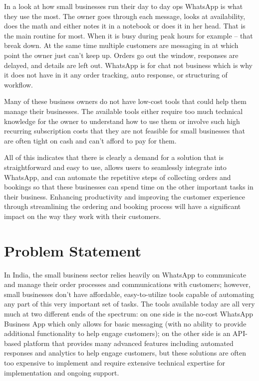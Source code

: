 In a look at how small businesses run their day to day ops WhatsApp is what they use the most. The owner goes through each message, looks at availability, does the math and either notes it in a notebook or does it in her head. That is the main routine for most. When it is busy during peak hours for example -- that break down. At the same time multiple customers are messaging in at which point the owner just can't keep up. Orders go out the window, responses are delayed, and details are left out. WhatsApp is for chat not business which is why it does not have in it any order tracking, auto response, or structuring of workflow.

Many of these business owners do not have low-cost tools that could help them manage their businesses. The available tools either require too much technical knowledge for the owner to understand how to use them or involve such high recurring subscription costs that they are not feasible for small businesses that are often tight on cash and can't afford to pay for them.

All of this indicates that there is clearly a demand for a solution that is straightforward and easy to use, allows users to seamlessly integrate into WhatsApp, and can automate the repetitive steps of collecting orders and bookings so that these businesses can spend time on the other important tasks in their business. Enhancing productivity and improving the customer experience through streamlining the ordering and booking process will have a significant impact on the way they work with their customers.


\section{Problem Statement}

In India, the small business sector relies heavily on WhatsApp to communicate and manage their order processes and communications with customers; however, small businesses don't have affordable, easy-to-utilize tools capable of automating any part of this very important set of tasks. The tools available today are all very much at two different ends of the spectrum: on one side is the no-cost WhatsApp Business App which only allows for basic messaging (with no ability to provide additional functionality to help engage customers); on the other side is an API-based platform that provides many advanced features including automated responses and analytics to help engage customers, but these solutions are often too expensive to implement and require extensive technical expertise for implementation and ongoing support.

